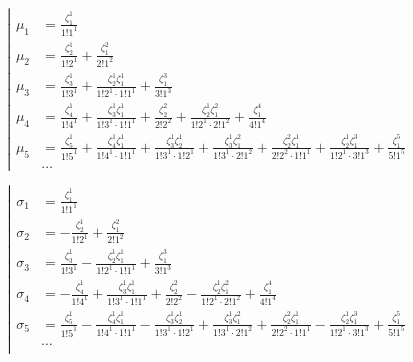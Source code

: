 \begin{equation*} \left| \begin{aligned} 
\mu_1 &
= \frac{\zeta_1^1}{1!1^1} \\ 
%
\mu_2 &
= \frac{\zeta_2^1}{1!2^1} 
+ \frac{\zeta_1^2}{2!1^2} \\
%
\mu_3 &
= \frac{\zeta_3^1}{1!3^1} 
+ \frac{\zeta_2^1 \zeta_1^1}{1!2^1 \cdot 1!1^1} 
+ \frac{\zeta_1^3}{3!1^3} \\
%
\mu_4 &
= \frac{\zeta_4^1}{1!4^1} 
+ \frac{\zeta_3^1 \zeta_1^1}{1!3^1 \cdot 1!1^1} 
+ \frac{\zeta_2^2}{2!2^2} 
+ \frac{\zeta_2^1 \zeta_1^2}{1!2^1 \cdot 2!1^2} 
+ \frac{\zeta_1^4}{4!1^4} \\
%
\mu_5 &
= \frac{\zeta_5^1}{1!5^1}
+ \frac{\zeta_4^1 \zeta_1^1}{1!4^1 \cdot 1!1^1}
+ \frac{\zeta_3^1 \zeta_2^1}{1!3^1 \cdot 1!2^1}
+ \frac{\zeta_3^1 \zeta_1^2}{1!3^1 \cdot 2!1^2}
+ \frac{\zeta_2^2 \zeta_1^1}{2!2^2 \cdot 1!1^1}
+ \frac{\zeta_2^1 \zeta_1^3}{1!2^1 \cdot 3!1^3}
+ \frac{\zeta_1^5}{5!1^5} \\
%
&\ldots
\end{aligned} \right. \end{equation*}

\begin{equation*} \left| \begin{aligned} 
\sigma_1 &=
  \frac{\zeta_1^1}{1!1^1}
\\ 
\sigma_2 &=
- \frac{\zeta_2^1}{1!2^1} 
+ \frac{\zeta_1^2}{2!1^2}
\\
\sigma_3 &=
  \frac{\zeta_3^1}{1!3^1} 
- \frac{\zeta_2^1 \zeta_1^1}{1!2^1 \cdot 1!1^1} 
+ \frac{\zeta_1^3}{3!1^3}
\\
\sigma_4 &=
- \frac{\zeta_4^1}{1!4^1} 
+ \frac{\zeta_3^1 \zeta_1^1}{1!3^1 \cdot 1!1^1} 
+ \frac{\zeta_2^2}{2!2^2} 
- \frac{\zeta_2^1 \zeta_1^2}{1!2^1 \cdot 2!1^2} 
+ \frac{\zeta_1^4}{4!1^4}
\\
\sigma_5 &=
  \frac{\zeta_5^1}{1!5^1}
- \frac{\zeta_4^1 \zeta_1^1}{1!4^1 \cdot 1!1^1}
- \frac{\zeta_3^1 \zeta_2^1}{1!3^1 \cdot 1!2^1}
+ \frac{\zeta_3^1 \zeta_1^2}{1!3^1 \cdot 2!1^2}
+ \frac{\zeta_2^2 \zeta_1^1}{2!2^2 \cdot 1!1^1}
- \frac{\zeta_2^1 \zeta_1^3}{1!2^1 \cdot 3!1^3}
+ \frac{\zeta_1^5}{5!1^5}
\\
&\ldots
\\
\end{aligned} \right. \end{equation*}

